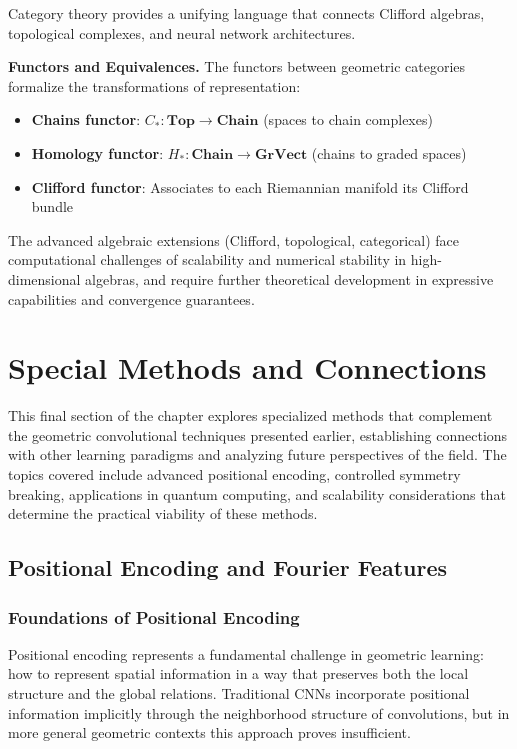 Category theory provides a unifying language that connects Clifford algebras, topological complexes, and neural network architectures.

\textbf{Functors and Equivalences.}\label{rem:funtores_equivalencias} The functors between geometric categories formalize the transformations of representation:
\begin{itemize}
    \item \textbf{Chains functor}: $C_*: \textbf{Top} \to \textbf{Chain}$ (spaces to chain complexes)
    \item \textbf{Homology functor}: $H_*: \textbf{Chain} \to \textbf{GrVect}$ (chains to graded spaces)
    \item \textbf{Clifford functor}: Associates to each Riemannian manifold its Clifford bundle
\end{itemize}

The advanced algebraic extensions (Clifford, topological, categorical) face computational challenges of scalability and numerical stability in high-dimensional algebras, and require further theoretical development in expressive capabilities and convergence guarantees.

\section{Special Methods and Connections}\label{sec:special_methods}

This final section of the chapter explores specialized methods that complement the geometric convolutional techniques presented earlier, establishing connections with other learning paradigms and analyzing future perspectives of the field. The topics covered include advanced positional encoding, controlled symmetry breaking, applications in quantum computing, and scalability considerations that determine the practical viability of these methods.

\subsection{Positional Encoding and Fourier Features}

\subsubsection{Foundations of Positional Encoding}

Positional encoding represents a fundamental challenge in geometric learning: how to represent spatial information in a way that preserves both the local structure and the global relations. Traditional CNNs incorporate positional information implicitly through the neighborhood structure of convolutions, but in more general geometric contexts this approach proves insufficient.

